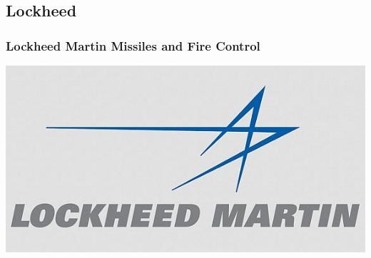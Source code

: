 \documentclass[aspectratio=169]{beamer}
\begin{document}

\subsection{Lockheed}

\begin{frame}
  \frametitle{Lockheed Martin Missiles and Fire Control}
  \center
  \includegraphics[width=.7\linewidth]{LockheedLogo}
\end{frame}
\end{document}
